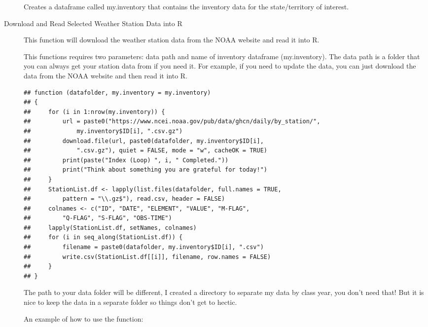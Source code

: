 \documentclass{article}\usepackage[]{graphicx}\usepackage[]{xcolor}
\makeatletter
\newenvironment{kframe}{%
 \def\at@end@of@kframe{}%
 \ifinner\ifhmode%
  \def\at@end@of@kframe{\end{minipage}}%
  \begin{minipage}{\columnwidth}%
 \fi\fi%
 \def\FrameCommand##1{\hskip\@totalleftmargin \hskip-\fboxsep
 \colorbox{shadecolor}{##1}\hskip-\fboxsep
     \hskip-\linewidth \hskip-\@totalleftmargin \hskip\columnwidth}%
 \MakeFramed {\advance\hsize-\width
   \@totalleftmargin\z@ \linewidth\hsize
   \@setminipage}}%
 {\par\unskip\endMakeFramed%
 \at@end@of@kframe}
\newenvironment{knitrout}{}{} %
\makeatother
\begin{document}
\begin{description}
Creates a dataframe called my.inventory that contains the inventory data for the state/territory of interest.

\item[Download and Read Selected Weather Station Data into R]  This function will download the weather station data from the NOAA website and read it into R.

This functions requires two parameters: data path and name of inventory dataframe (my.inventory). The data path is a folder that you can always get your station data from if you need it. For example, if you need to update the data, you can just download the data from the NOAA website and then read it into R. 

\begin{knitrout}
\color{fgcolor}\begin{kframe}
\begin{verbatim}
## function (datafolder, my.inventory = my.inventory) 
## {
##     for (i in 1:nrow(my.inventory)) {
##         url = paste0("https://www.ncei.noaa.gov/pub/data/ghcn/daily/by_station/", 
##             my.inventory$ID[i], ".csv.gz")
##         download.file(url, paste0(datafolder, my.inventory$ID[i], 
##             ".csv.gz"), quiet = FALSE, mode = "w", cacheOK = TRUE)
##         print(paste("Index (Loop) ", i, " Completed."))
##         print("Think about something you are grateful for today!")
##     }
##     StationList.df <- lapply(list.files(datafolder, full.names = TRUE, 
##         pattern = "\\.gz$"), read.csv, header = FALSE)
##     colnames <- c("ID", "DATE", "ELEMENT", "VALUE", "M-FLAG", 
##         "Q-FLAG", "S-FLAG", "OBS-TIME")
##     lapply(StationList.df, setNames, colnames)
##     for (i in seq_along(StationList.df)) {
##         filename = paste0(datafolder, my.inventory$ID[i], ".csv")
##         write.csv(StationList.df[[i]], filename, row.names = FALSE)
##     }
## }
\end{verbatim}
\end{kframe}
\end{knitrout}

The path to your data folder will be different, I created a directory to separate my data by class year, you don't need that! But it is nice to keep the data in a separate folder so things don't get to hectic.

An example of how to use the function: 


\end{description}
\end{document}
